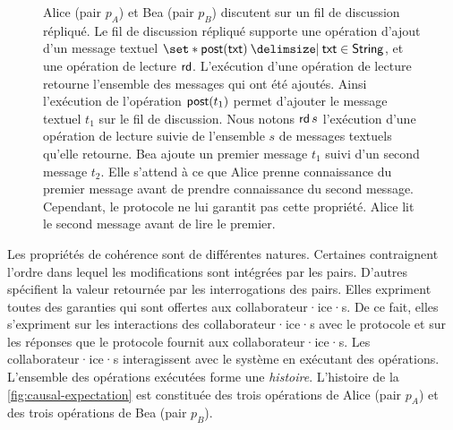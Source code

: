 
\begin{figure}[htb]
\centering
{}
\caption[Attentes des collaborateur·ice·s]{Alice (pair $p_A$) et Bea (pair $p_B$) discutent sur un fil de discussion répliqué.
Le fil de discussion répliqué supporte une opération d'ajout d'un message textuel $\set*{\trm{post}(\trm{txt}) \given \trm{txt} \in \trm{String} }$, et une opération de lecture $\operatorname{\mathsf{rd}}$.
L'exécution d'une opération de lecture retourne l'ensemble des messages qui ont été ajoutés.
Ainsi l'exécution de l'opération $\operatorname{\mathsf{post}}(t_1)$ permet d'ajouter le message textuel $t_1$ sur le fil de discussion.
Nous notons $\operatorname{\mathsf{rd}} s$ l'exécution d'une opération de lecture suivie de l'ensemble $s$ de messages textuels qu'elle retourne.
Bea ajoute un premier message $t_1$ suivi d'un second message $t_2$.
Elle s'attend à ce que Alice prenne connaissance du premier message avant de prendre connaissance du second message.
Cependant, le protocole ne lui garantit pas cette propriété.
Alice lit le second message avant de lire le premier.}\label{fig:causal-expectation}
\end{figure}

Les propriétés de cohérence sont de différentes natures.
Certaines contraignent l'ordre dans lequel les modifications sont intégrées par les pairs.
D'autres spécifient la valeur retournée par les interrogations des pairs.
Elles expriment toutes des garanties qui sont offertes aux collaborateur·ice·s.
De ce fait, elles s'expriment sur les interactions des collaborateur·ice·s avec le protocole et sur les réponses que le protocole fournit aux collaborateur·ice·s.
Les collaborateur·ice·s interagissent avec le système en exécutant des opérations.
L'ensemble des opérations exécutées forme une \emph{histoire}.
L'histoire de la \autoref{fig:causal-expectation} est constituée des trois opérations de Alice (pair $p_A$) et des trois opérations de Bea (pair $p_B$).

